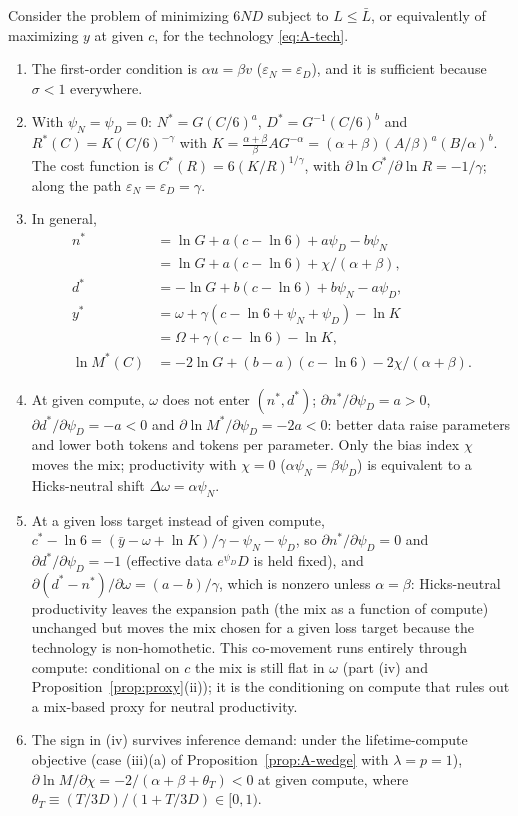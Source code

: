 \begin{lemma}\label{lem:alloc}
Consider the problem of minimizing $6ND$ subject to $L\le\bar L$, or equivalently of maximizing $y$ at given $c$, for
the technology \eqref{eq:A-tech}.
\begin{enumerate}
\item[(i)] The first-order condition is $\alpha u=\beta v$ ($\varepsilon_N=\varepsilon_D$), and it is sufficient because
$\sigma<1$ everywhere.
\item[(ii)] With $\psi_N=\psi_D=0$: $N^*=G(C/6)^{a}$, $D^*=G^{-1}(C/6)^{b}$ and $R^*(C)=K(C/6)^{-\gamma}$ with
$K=\frac{\alpha+\beta}{\beta}AG^{-\alpha}=(\alpha+\beta)(A/\beta)^{a}(B/\alpha)^{b}$. The cost function is
$C^*(R)=6(K/R)^{1/\gamma}$, with $\partial\ln C^*/\partial\ln R=-1/\gamma$; along the path
$\varepsilon_N=\varepsilon_D=\gamma$.
\item[(iii)] In general,
\begin{align*}
n^*&=\ln G+a(c-\ln6)+a\psi_D-b\psi_N\\
&=\ln G+a(c-\ln 6)+\chi/(\alpha+\beta),\\
d^*&=-\ln G+b(c-\ln6)+b\psi_N-a\psi_D,\\
y^*&=\omega+\gamma(c-\ln6+\psi_N+\psi_D)-\ln K\\
&=\Omega+\gamma(c-\ln6)-\ln K,\\
\ln M^*(C)&=-2\ln G+(b-a)(c-\ln6)-2\chi/(\alpha+\beta).
\end{align*}
\item[(iv)] At given compute, $\omega$ does not enter $(n^*,d^*)$; $\partial n^*/\partial\psi_D=a>0$,
$\partial d^*/\partial\psi_D=-a<0$ and $\partial\ln M^*/\partial\psi_D=-2a<0$: better data raise parameters and lower
both tokens and tokens per parameter. Only the bias index $\chi$ moves the mix; productivity with $\chi=0$
($\alpha\psi_N=\beta\psi_D$) is equivalent to a Hicks-neutral shift $\Delta\omega=\alpha\psi_N$.
\item[(v)] At a given loss target instead of given compute, $c^*-\ln6=(\bar y-\omega+\ln K)/\gamma-\psi_N-\psi_D$, so
$\partial n^*/\partial\psi_D=0$ and $\partial d^*/\partial\psi_D=-1$ (effective data $e^{\psi_D}D$ is held fixed), and
$\partial(d^*-n^*)/\partial\omega=(a-b)/\gamma$, which is nonzero unless $\alpha=\beta$: Hicks-neutral productivity leaves
the expansion path (the mix as a function of compute) unchanged but moves the mix chosen for a given loss target
because the technology is non-homothetic. This co-movement runs entirely through compute: conditional on $c$ the mix
is still flat in $\omega$ (part (iv) and Proposition~\ref{prop:proxy}(ii)); it is the conditioning on compute that rules
out a mix-based proxy for neutral productivity.
\item[(vi)] The sign in (iv) survives inference demand: under the lifetime-compute objective (case (iii)(a) of
Proposition~\ref{prop:A-wedge} with $\lambda=p=1$), $\partial\ln M/\partial\chi=-2/(\alpha+\beta+\theta_T)<0$ at given compute, where
$\theta_T\equiv(T/3D)/(1+T/3D)\in[0,1)$.
\end{enumerate}
\end{lemma}

